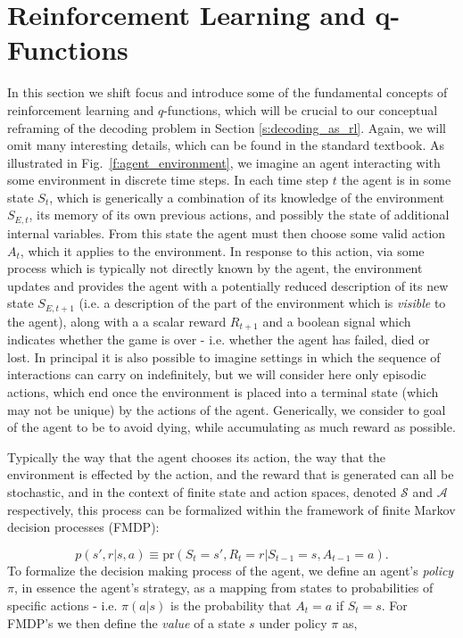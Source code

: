 \documentclass[twocolumn,preprintnumbers,amsmath,amssymb,notitlepage,nofootinbib,longbibliography,superscriptaddress,aps,pra,10pt]{revtex4-1}
\begin{document}
\section{Reinforcement Learning and q-Functions}\label{s:reinforcement_learning}

	In this section we shift focus and introduce some of the fundamental concepts of reinforcement learning and $q$-functions, which will be crucial to our conceptual reframing of the decoding problem in Section \ref{s:decoding_as_rl}.
	Again, we will omit many interesting details, which can be found in the standard textbook.
	As illustrated in Fig.~\ref{f:agent_environment}, we imagine an agent interacting with some environment in discrete time steps.
	In each time step $t$ the agent is in some state $S_t$, which is generically a combination of its knowledge of the environment $S_{E,t}$, its memory of its own previous actions, and possibly the state of additional internal variables.
	From this state the agent must then choose some valid action $A_t$, which it applies to the environment.
	In response to this action, via some process which is typically not directly known by the agent, the environment updates and provides the agent with a potentially reduced description of its new state $S_{E,t+1}$ (i.e. a description of the part of the environment which is \textit{visible} to the agent), along with a a scalar reward $R_{t+1}$ and a boolean signal which indicates whether the game is over - i.e. whether the agent has failed, died or lost.
	In principal it is also possible to imagine settings in which the sequence of interactions can carry on indefinitely, but we will consider here only episodic actions, which end once the environment is placed into a terminal state (which may not be unique) by the actions of the agent.
	Generically, we consider to goal of the agent to be to avoid dying, while accumulating as much reward as possible.

	Typically the way that the agent chooses its action, the way that the environment is effected by the action, and the reward that is generated can all be stochastic, and in the context of finite state and action spaces, denoted $\mathcal{S}$ and $\mathcal{A}$ respectively, this process can be formalized within the framework of finite Markov decision processes (FMDP):

	\begin{equation}
		p(s',r|s,a) \equiv \mathrm{pr}(S_t = s',R_t = r|S_{t-1} = s, A_{t-1} = a).
	\end{equation}
	To formalize the decision making process of the agent, we define an agent's \textit{policy} $\pi$, in essence the agent's strategy, as a mapping from states to probabilities of specific actions - i.e. $\pi(a|s)$ is the probability that $A_t = a$ if $S_t = s$.
	For FMDP's we then define the \textit{value} of a state $s$ under policy $\pi$ as,
\end{document}
